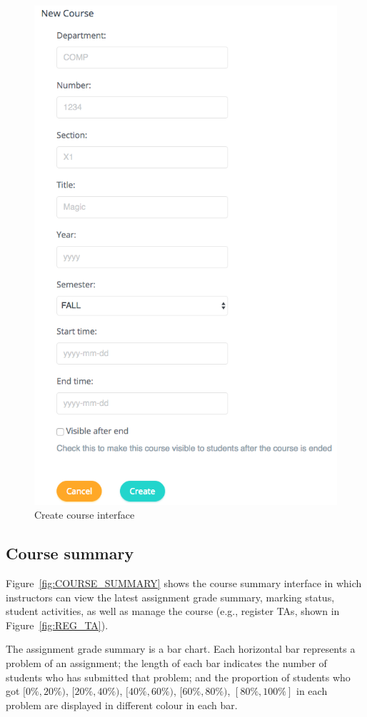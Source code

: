 \begin{figure}[H]
    \centering
        \includegraphics[width=.6\textwidth]{figures/create-courses}
    \caption{Create course interface}
    \label{fig:NEW_COURSE}
\end{figure}

\subsection{Course summary}
Figure~\ref{fig:COURSE_SUMMARY} shows the course summary interface in which
instructors can view the latest assignment grade summary, marking status,
student activities, as well as manage the course (e.g., register TAs, shown
in Figure~\ref{fig:REG_TA}).

The assignment grade summary is a bar chart. Each horizontal bar represents
a problem of an assignment; the length of each bar indicates the number
of students who has submitted that problem; and the proportion of students who
got $[0\%, 20\%)$, $[20\%, 40\%)$, $[40\%, 60\%)$, $[60\%, 80\%)$,
$[80\%, 100\%]$ in each problem are displayed in different colour in each bar.


